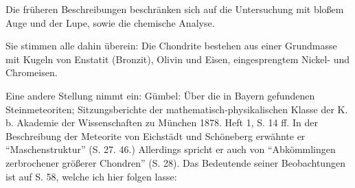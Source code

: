 \documentclass[a4paper, 12pt, oneside]{article}
\begin{document}
Die früheren Beschreibungen beschränken sich auf die Untersuchung mit bloßem Auge und der Lupe, sowie die chemische Analyse.

Sie stimmen alle dahin überein: Die Chondrite bestehen aus einer Grundmasse mit Kugeln von Enstatit (Bronzit), Olivin und Eisen, eingesprengtem Nickel- und Chromeisen.

Eine andere Stellung nimmt ein: Gümbel: Über die in Bayern gefundenen Steinmeteoriten; Sitzungsberichte der mathematisch-physikalischen Klasse der K. b. Akademie der Wissenschaften zu München 1878. Heft 1, S. 14 ff. In der Beschreibung der Meteorite von Eichstädt und Schöneberg erwähnte er "`Maschenstruktur"' (S. 27. 46.) Allerdings spricht er auch von "`Abkömmlingen zerbrochener größerer Chondren"' (S. 28). Das Bedeutende seiner Beobachtungen ist auf S. 58, welche ich hier folgen lasse:
\end{document}
